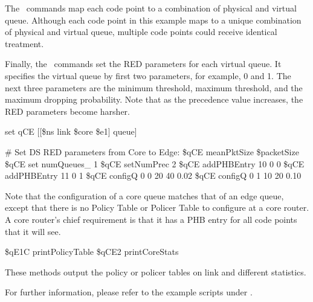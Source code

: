 The~ commands map each code point to 
  a combination of physical and virtual queue.
Although each code point in this example maps to 
  a unique combination of physical and virtual queue,
  multiple code points could receive identical treatment.

Finally, the~ commands set the RED parameters for 
  each virtual queue.  
It specifies the virtual queue by first two parameters,
  for example, 0 and 1.
The next three parameters are the minimum threshold, maximum threshold,
  and the maximum dropping probability.
Note that as the precedence value increases, 
  the RED parameters become harsher.

\begin{program}

set qCE [[\$ns link \$core \$e1] queue]

# Set DS RED parameters from Core to Edge:
\$qCE meanPktSize \$packetSize
\$qCE set numQueues_ 1
\$qCE setNumPrec 2
\$qCE addPHBEntry 10 0 0
\$qCE addPHBEntry 11 0 1
\$qCE configQ 0 0 20 40 0.02
\$qCE configQ 0 1 10 20 0.10

\end{program}

Note that the configuration of a core queue matches that of an edge queue, 
  except that there is no Policy Table or Policer Table to 
  configure at a core router.  
A core router's chief requirement is that it has a PHB entry for 
  all code points that it will see.

\begin{program}
\$qE1C printPolicyTable
\$qCE2 printCoreStats
\end{program}

These methods output the policy or policer tables on link and different 
  statistics.  

For further information, please refer to the example scripts under 
.
